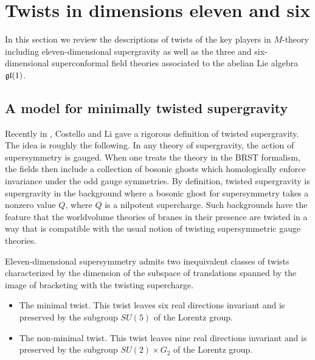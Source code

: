 %

%
%
%

\section{Twists in dimensions eleven and six}
\label{s:twisted}

In this section we review the descriptions of twists of the key players in $M$-theory including eleven-dimensional supergravity as well as the three and six-dimensional superconformal field theories associated to the abelian Lie algebra~$\mathfrak{gl}(1)$.

\subsection{A model for minimally twisted supergravity}


Recently in \cite{CLsugra}, Costello and Li gave a rigorous definition of twisted supergravity.
The idea is roughly the following.
In any theory of supergravity, the action of supersymmetry is gauged. 
When one treats the theory in the BRST formalism, the fields then include a collection of bosonic ghosts which homologically enforce invariance under the odd gauge symmetries.
By definition, twisted supergravity is supergravity in the background where a bosonic ghost for supersymmetry takes a nonzero value $Q$, where $Q$ is a nilpotent supercharge. 
Such backgrounds have the feature that the worldvolume theories of branes in their presence are twisted in a way that is compatible with the usual notion of twisting supersymmetric gauge theories.

Eleven-dimensional supersymmetry admits two inequivalent classes of twists characterized by the dimension of the subspace of translations spanned by the image of bracketing with the twisting supercharge.
\begin{itemize}
\item 
The minimal twist. 
This twist leaves six real directions invariant and is preserved by the subgroup $SU(5)$ of the Lorentz group. 
\item 
The non-minimal twist. 
This twist leaves nine real directions invariant and is preserved by the subgroup $SU(2) \times G_2$ of the Lorentz group. 
\end{itemize}

